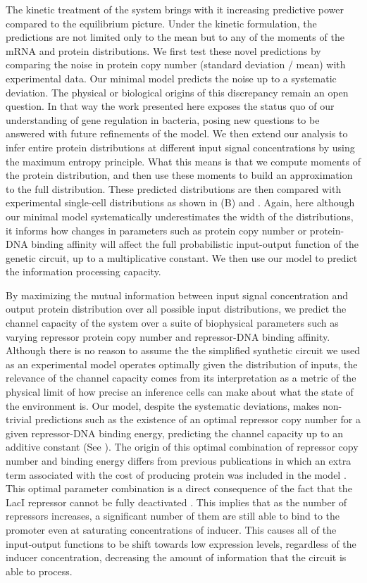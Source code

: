 The kinetic treatment of the system brings with it increasing predictive power
compared to the equilibrium picture. Under the kinetic formulation, the
predictions are not limited only to the mean but to any of the moments of the
mRNA and protein distributions. We first test these novel predictions by
comparing the noise in protein copy number (standard deviation / mean) with
experimental data. Our minimal model predicts the noise up to a systematic
deviation. The physical or biological origins of this discrepancy remain an
open question. In that way the work presented here exposes the status quo of
our understanding of gene regulation in bacteria, posing new questions to be
answered with future refinements of the model. We then extend our analysis to
infer entire protein distributions at different input signal concentrations by
using the maximum entropy principle. What this means is that we compute moments
of the protein distribution, and then use these moments to build an
approximation to the full distribution. These predicted distributions are then
compared with experimental single-cell distributions as shown in
(B) and . Again, here although our minimal
model systematically underestimates the width of the distributions, it informs
how changes in parameters such as protein copy number or protein-DNA binding
affinity will affect the full probabilistic input-output function of the genetic
circuit, up to a multiplicative constant. We then use our model to predict the
information processing capacity.

By maximizing the mutual information between input signal concentration and
output protein distribution over all possible input distributions, we predict
the channel capacity of the system over a suite of biophysical parameters such
as varying repressor protein copy number and repressor-DNA binding affinity.
Although there is no reason to assume the the simplified synthetic circuit we
used as an experimental model operates optimally given the distribution of
inputs, the relevance of the channel capacity comes from its interpretation as
a metric of the physical limit of how precise an inference cells can
make about what the state of the environment is. Our model, despite the
systematic deviations, makes non-trivial predictions such as the existence of
an optimal repressor copy number for a given repressor-DNA binding energy,
predicting the channel capacity up to an additive constant (See
). The origin of this optimal combination of repressor copy
number and binding energy differs from previous publications in which an extra
term associated with the cost of producing protein was included in the model
\cite{Tkacik2011}. This optimal parameter combination is a direct consequence
of the fact that the LacI repressor cannot be fully deactivated
\cite{Razo-Mejia2018}. This implies that as the number of repressors increases,
a significant number of them are still able to bind to the promoter even at
saturating concentrations of inducer. This causes all of the input-output
functions to be shift towards low expression levels, regardless of the inducer
concentration, decreasing the amount of information that the circuit is able to
process.

